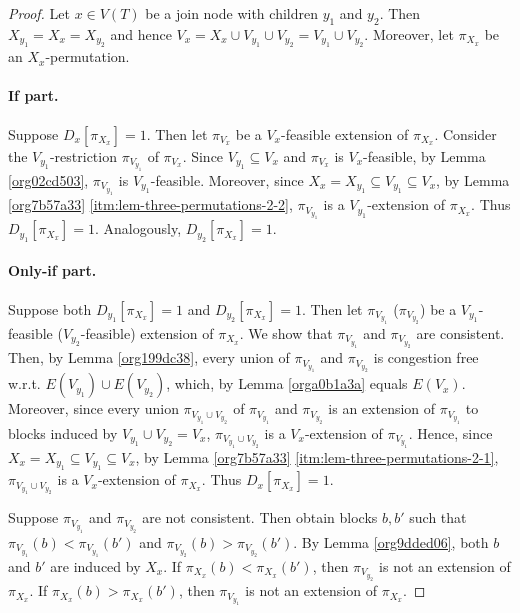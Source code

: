 \documentclass[fontsize=11pt,paper=a4]{book}
\begin{document}
\begin{proof}
Let \(x\in V(T)\) be a join node with children \(y_1\) and \(y_2\).
Then \(X_{y_1}=X_x=X_{y_2}\) and hence \(V_x=X_x\cup V_{y_1}\cup V_{y_2}=V_{y_1}\cup V_{y_2}\).
Moreover, let \(\pi_{X_x}\) be an \(X_x\)-permutation.

\paragraph{If part.}
Suppose \(D_x[\pi_{X_x}]=1\).
Then let \(\pi_{V_x}\) be a \(V_x\)-feasible extension of \(\pi_{X_x}\).
Consider the \(V_{y_1}\)-restriction \(\pi_{V_{y_1}}\) of \(\pi_{V_x}\).
Since \(V_{y_1}\subseteq V_x\) and \(\pi_{V_x}\) is \(V_x\)-feasible, by Lemma \ref{org02cd503}, \(\pi_{V_{y_1}}\) is \(V_{y_1}\)-feasible.
Moreover, since \(X_x=X_{y_1}\subseteq V_{y_1}\subseteq V_x\), by Lemma \ref{org7b57a33} \ref{itm:lem-three-permutations-2-2}, \(\pi_{V_{y_1}}\) is a \(V_{y_1}\)-extension of \(\pi_{X_x}\).
Thus \(D_{y_1}[\pi_{X_x}]=1\).
Analogously, \(D_{y_2}[\pi_{X_x}]=1\).

\paragraph{Only-if part.}
Suppose both \(D_{y_1}[\pi_{X_x}]=1\) and \(D_{y_2}[\pi_{X_x}]=1\).
Then let \(\pi_{V_{y_1}}\) (\(\pi_{V_{y_2}}\)) be a \(V_{y_1}\)-feasible (\(V_{y_2}\)-feasible) extension of \(\pi_{X_x}\).
We show that \(\pi_{V_{y_1}}\) and \(\pi_{V_{y_2}}\) are consistent.
Then, by Lemma \ref{org199dc38}, every union of \(\pi_{V_{y_1}}\) and \(\pi_{V_{y_2}}\) is congestion free w.r.t. \(E(V_{y_1})\cup E(V_{y_2})\), which, by Lemma \ref{orga0b1a3a} equals \(E(V_x)\).
Moreover, since every union \(\pi_{V_{y_1}\cup V_{y_2}}\) of \(\pi_{V_{y_1}}\) and \(\pi_{V_{y_2}}\) is an extension of \(\pi_{V_{y_1}}\) to blocks induced by \(V_{y_1}\cup V_{y_2}=V_x\), \(\pi_{V_{y_1}\cup V_{y_2}}\) is a \(V_x\)-extension of \(\pi_{V_{y_1}}\).
Hence, since \(X_x=X_{y_1}\subseteq V_{y_1}\subseteq V_x\), by Lemma \ref{org7b57a33} \ref{itm:lem-three-permutations-2-1}, \(\pi_{V_{y_1}\cup V_{y_2}}\) is a \(V_x\)-extension of \(\pi_{X_x}\).
Thus \(D_x[\pi_{X_x}]=1\).

Suppose \(\pi_{V_{y_1}}\) and \(\pi_{V_{y_2}}\) are not consistent.
Then obtain blocks \(b,b'\) such that \(\pi_{V_{y_1}}(b)<\pi_{V_{y_1}}(b')\) and \(\pi_{V_{y_2}}(b)>\pi_{V_{y_2}}(b')\).
By Lemma \ref{org9dded06}, both \(b\) and \(b'\) are induced by \(X_x\).
If \(\pi_{X_x}(b)<\pi_{X_x}(b')\), then \(\pi_{V_{y_2}}\) is not an extension of \(\pi_{X_x}\).
If \(\pi_{X_x}(b)>\pi_{X_x}(b')\), then \(\pi_{V_{y_1}}\) is not an extension of \(\pi_{X_x}\).
\end{proof}
\end{document}
